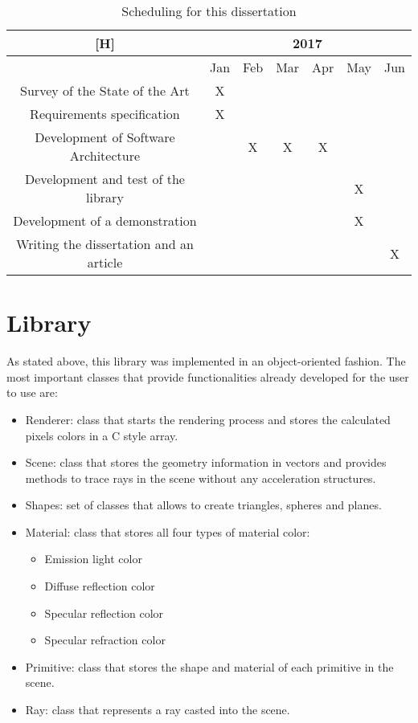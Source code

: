 \begin{table}[H]
\centering
\caption{Scheduling for this dissertation}
\label{Scheduling for this dissertation}
\begin{tabular}{|c|c|c|c|c|c|c|}[H]
\hline
\textbf{}                               & \multicolumn{6}{c|}{\textbf{2017}} \\ \hline
                                        & Jan  & Feb & Mar & Apr & May & Jun \\ \hline
Survey of the State of the Art          & X    &     &     &     &     &     \\ \hline
Requirements specification              & X    &     &     &     &     &     \\ \hline
Development of Software Architecture    &      & X   & X   & X   &     &     \\ \hline
Development and test of the library     &      &     &     &     & X   &     \\ \hline
Development of a demonstration          &      &     &     &     & X   &     \\ \hline
Writing the dissertation and an article &      &     &     &     &     & X   \\ \hline
\end{tabular}
\end{table}

\fi



\section{Library}

\par
As stated above, this library was implemented in an object-oriented fashion.
The most important classes that provide functionalities already developed for the user to use are:

\begin{itemize}
\item Renderer: class that starts the rendering process and stores the calculated pixels colors in a C style array.
\item Scene: class that stores the geometry information in vectors and provides methods to trace rays in the scene without any acceleration structures.
\item Shapes: set of classes that allows to create triangles, spheres and planes.
\item Material: class that stores all four types of material color:
\begin{itemize}
	\item Emission light color
	\item Diffuse reflection color
	\item Specular reflection color
	\item Specular refraction color
\end{itemize}
\item Primitive: class that stores the shape and material of each primitive in the scene.
\item Ray: class that represents a ray casted into the scene.
\end{itemize}

